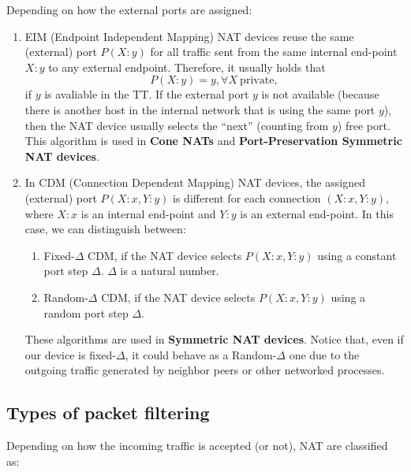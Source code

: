 Depending on how the external ports are assigned:

\begin{enumerate}
\item EIM (Endpoint Independent Mapping) NAT devices reuse the same
  (external) port $P(X:y)$ for all traffic sent from the same internal
  end-point $X:y$ to any external endpoint. Therefore, it usually
  holds that
  \begin{equation}
    P(X:y)=y, \forall X~\mathrm{private},
  \end{equation}
  if $y$ is avaliable in the TT. If the external port $y$ is not
  available (because there is another host in the internal network
  that is using the same port $y$), then the NAT device usually
  selects the ``next'' (counting from $y$) free port.  This algorithm
  is used in \textbf{Cone NATs} and \textbf{Port-Preservation
    Symmetric NAT devices}.
\item In CDM (Connection Dependent Mapping) NAT devices, the assigned
  (external) port $P(X:x,Y:y)$ is different for each connection
  $(X:x,Y:y)$, where $X:x$ is an internal end-point and $Y:y$ is an
  external end-point. In this case, we can distinguish between:
  \begin{enumerate}
  \item Fixed-$\Delta$ CDM, if the NAT device selects $P(X:x,Y:y)$
    using a constant port step $\Delta$. $\Delta$ is a natural number.
    \item Random-$\Delta$ CDM, if the NAT device selects $P(X:x,Y:y)$
      using a random port step $\Delta$.
  \end{enumerate}
  These algorithms are used in \textbf{Symmetric NAT devices}. Notice
  that, even if our device is fixed-$\Delta$, it could behave as a
  Random-$\Delta$ one due to the outgoing traffic generated by
  neighbor peers or other networked processes.
\end{enumerate}

\subsection{Types of packet filtering}

Depending on how the incoming traffic is accepted (or not), NAT are
classified as:

